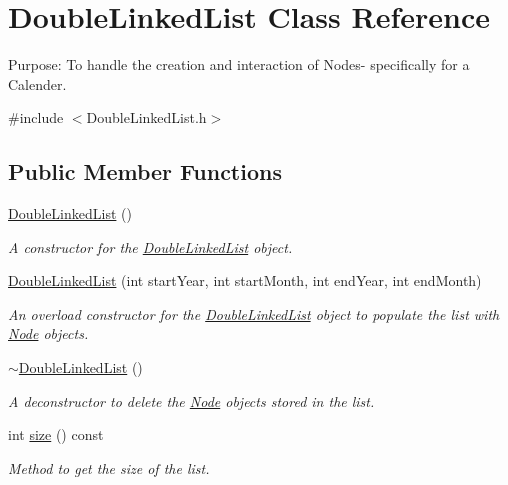 \hypertarget{class_double_linked_list}{}\section{Double\+Linked\+List Class Reference}
\label{class_double_linked_list}


Purpose\+: To handle the creation and interaction of Nodes-\/ specifically for a Calender.  




{\ttfamily \#include $<$Double\+Linked\+List.\+h$>$}

\subsection*{Public Member Functions}
\begin{DoxyCompactItemize}
\item 
\hyperlink{class_double_linked_list_a7e2c72978120a51da2251e378ef1892c}{Double\+Linked\+List} ()
\begin{DoxyCompactList}\small\item\em A constructor for the \hyperlink{class_double_linked_list}{Double\+Linked\+List} object. \end{DoxyCompactList}\item 
\hyperlink{class_double_linked_list_aca14acc73e64f2cf121f1a9f06f37693}{Double\+Linked\+List} (int start\+Year, int start\+Month, int end\+Year, int end\+Month)
\begin{DoxyCompactList}\small\item\em An overload constructor for the \hyperlink{class_double_linked_list}{Double\+Linked\+List} object to populate the list with \hyperlink{class_node}{Node} objects. \end{DoxyCompactList}\item 
\hyperlink{class_double_linked_list_ab808039dac47f1f62d00fcf0951550c5}{$\sim$\+Double\+Linked\+List} ()
\begin{DoxyCompactList}\small\item\em A deconstructor to delete the \hyperlink{class_node}{Node} objects stored in the list. \end{DoxyCompactList}\item 
int \hyperlink{class_double_linked_list_afc6ea2333d56b8d011b32a982b52986e}{size} () const
\begin{DoxyCompactList}\small\item\em Method to get the size of the list. \end{DoxyCompactList}\item 

\end{DoxyCompactItemize}
